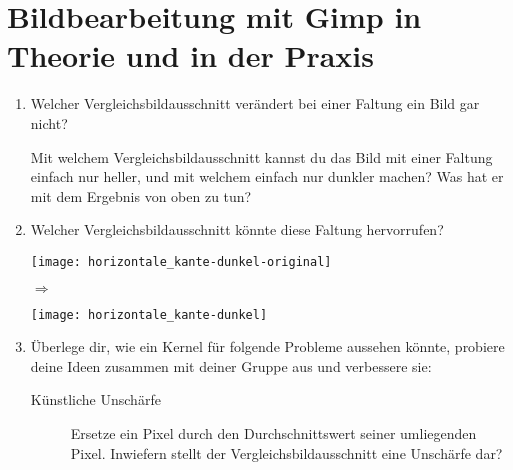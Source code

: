 \section*{Bildbearbeitung mit Gimp in Theorie und in der Praxis}
\begin{enumerate}
\item Welcher Vergleichsbildausschnitt verändert bei einer Faltung ein
  Bild gar nicht?
  \par
  Mit welchem Vergleichsbildausschnitt kannst du das Bild mit einer
  Faltung einfach nur heller, und mit welchem einfach nur dunkler
  machen? Was hat er mit dem Ergebnis von oben zu tun? 
\item Welcher Vergleichsbildausschnitt könnte diese Faltung hervorrufen?
  \begin{center}
    \parbox[c]{0.4\linewidth}{
      \texttt{[image: horizontale\_kante-dunkel-original]}
      \\\hbox{}}
    $\Rightarrow$
    \parbox[c]{0.4\linewidth}{
      \texttt{[image: horizontale\_kante-dunkel]}
      \\\hbox{}}
  \end{center}
\item Überlege dir, wie ein Kernel für folgende Probleme aussehen könnte,
  probiere deine Ideen zusammen mit deiner Gruppe aus und verbessere
  sie:
  \begin{description}
  \item[Künstliche Unschärfe] Ersetze ein Pixel durch den
    Durchschnittswert seiner umliegenden Pixel.
    Inwiefern stellt der Vergleichsbildausschnitt eine Unschärfe dar?

\end{description}
\end{enumerate}
